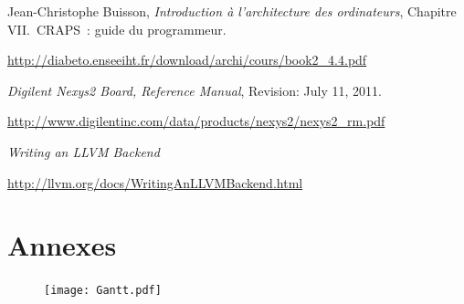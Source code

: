 \documentclass[openany, a4paper]{book}
\begin{document}
  \begin{thebibliography}{9}
      Jean-Christophe Buisson,
      \emph{Introduction à l'architecture des ordinateurs},
      Chapitre VII.\ CRAPS~: guide du programmeur.

      \mbox{\url{http://diabeto.enseeiht.fr/download/archi/cours/book2_4.4.pdf}}

      \emph{Digilent Nexys2 Board, Reference Manual},
      Revision: July 11, 2011.

      \mbox{\url{http://www.digilentinc.com/data/products/nexys2/nexys2_rm.pdf}}

      \emph{Writing an LLVM Backend}

      \mbox{\url{http://llvm.org/docs/WritingAnLLVMBackend.html}}
  \end{thebibliography}

  \chapter*{Annexes}
    \thispagestyle{empty}
    \begin{figure}
      \centering
      \texttt{[image: Gantt.pdf]}
      \label{fig:gantt}
    \end{figure}
    \clearpage
    \restoregeometry
\end{document}
